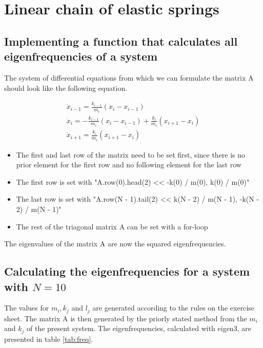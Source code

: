 \section{Linear chain of elastic springs}

\subsection{Implementing a function that calculates all eigenfrequencies of a system}
The system of differential equations from which we can formulate the matrix A should look like the following equation.

\begin{align}
\ddot{x}_{i-1} = \frac{k_{i-1}}{m_i}(x_i - x_{i-1})\\
\ddot{x}_i = - \frac{k_{i-1}}{m_i}(x_i - x_{i-1}) + \frac{k_i}{m_i}(x_{i+1}-x_i)\\
\ddot{x}_{i+1} = \frac{k_{i}}{m_i}(x_{i+1} - x_i)
\end{align}
\begin{itemize}
\item The first and last row of the matrix need to be set first, since there is no prior element for the first row and no following element for the last row 
\item The first row is set with "A.row(0).head(2) << -k(0) / m(0), k(0) / m(0)"
\item The last row is set with "A.row(N - 1).tail(2) << k(N - 2) / m(N - 1), -k(N - 2) / m(N - 1)"
\item The rest of the triagonal matrix A can be set with a for-loop
\end{itemize}
The eigenvalues of the matrix A are now the squared eigenfrequencies.

\subsection{Calculating the eigenfrequencies for a system with $N=10$}

The values for $m_i,k_j$ and $l_j$ are generated according to the rules on the exercise sheet.
The matrix A is then generated by the priorly stated method from the $m_i$ and $k_j$ of the present system.
The eigenfrequencies, calculated with eigen3, are presented in table \ref{tab:freq}.


